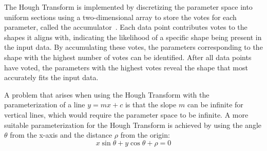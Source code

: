 The Hough Transform is implemented by discretizing the parameter space into uniform sections
using a two-dimensional array to store the votes for each parameter, called the accumulator~\parencite{duda_use_1972}.
Each data point contributes votes to the shapes it aligns with, indicating the likelihood of a specific shape being present in the input data.
By accumulating these votes, the parameters corresponding to the shape with the highest number of votes can be identified.
After all data points have voted, the parameters with the highest votes reveal the shape that most accurately fits the input data.

A problem that arises when using the Hough Transform with the parameterization of a line $y = mx + c$
is that the slope $m$ can be infinite for vertical lines, which would require the parameter space to be infinite.
A more suitable parameterization for the Hough Transform is achieved by using the angle $\theta$
from the x-axis and the distance $\rho$ from the origin:
\begin{equation}
    x \sin \theta + y \cos \theta + \rho = 0
\end{equation}
